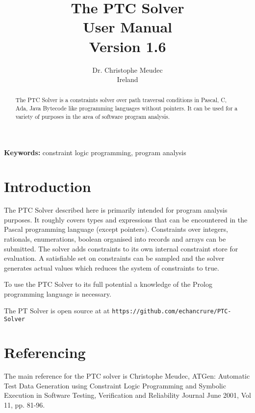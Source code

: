 \documentclass{article}
\begin{document}
\title{The PTC Solver\\
       User Manual\\
       Version 1.6}
\author{Dr. Christophe Meudec \\
        Ireland}
\maketitle

\begin{abstract}
The PTC Solver is a constraints solver over path traversal conditions in Pascal,
C, Ada, Java Bytecode like programming languages without pointers. It
can be used for a variety of purposes in the area of software program analysis.
\end{abstract}


\noindent\textbf{Keywords:} constraint logic programming, program analysis

\section{Introduction}

The PTC Solver described here is primarily intended for program analysis
purposes.
It roughly covers types and expressions that can be encountered in the Pascal
programming language (except pointers). Constraints over integers, rationals,
enumerations, boolean organised into records and arrays can be submitted. The
solver adds constraints to its own internal constraint store for evaluation. A
satisfiable set on constraints can be sampled and the solver generates actual
values which reduces the system of constraints to true.

To use the PTC Solver to its full potential a knowledge of the Prolog programming language is necessary.

The PT Solver is open source at at \texttt{https://github.com/echancrure/PTC-Solver}

\section{Referencing}

The main reference for the PTC solver is Christophe Meudec,
ATGen: Automatic Test Data Generation using Constraint Logic Programming and
Symbolic Execution
in Software Testing, Verification and Reliability Journal
June 2001, Vol 11, pp. 81-96.
\end{document}
